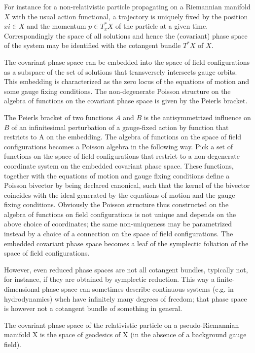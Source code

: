 \documentclass[Main]{subfiles}
\begin{document}
 For instance for a non-relativistic particle propagating on a Riemannian manifold $X$ with the usual action functional, a trajectory is uniquely fixed by the position $xi \in X$ and the momentum $p\in T^*_x X$ of the particle at a given time. 
 Correspondingly the space of all solutions and hence the (covariant) phase space of the system may be identified with the cotangent bundle $T^*X$ of $X$.

 The covariant phase space can be embedded into the space of field configurations as a subspace of the set of solutions that transversely intersects gauge orbits.  
 This embedding is characterized as the zero locus of the equations of motion and some gauge fixing conditions. The non-degenerate Poisson structure on the algebra of functions on the covariant phase space is given by the Peierls bracket.

 The Peierls bracket of two functions $A$ and $B$ is the antisymmetrized influence on $B$ of an infinitesimal perturbation of a gauge-fixed action by function that restricts to A on the embedding. 
 The algebra of functions on the space of field configurations becomes a Poisson algebra in the following way. Pick a set of functions on the space of field configurations that restrict to a non-degenerate coordinate system on the embedded covariant phase space. 
 These functions, together with the equations of motion and gauge fixing conditions define a Poisson bivector by being declared canonical, such that the kernel of the bivector coincides with the ideal generated by the equations of motion and the gauge fixing conditions. 
 Obviously the Poisson structure thus constructed on the algebra of functions on field configurations is not unique and depends on the above choice of coordinates; the same non-uniqueness may be parametrized instead by a choice of a connection on the space of field configurations. 
 The embedded covariant phase space becomes a leaf of the symplectic foliation of the space of field configurations.

 However, even reduced phase spaces are not all cotangent bundles, typically not, for instance, if they are obtained by symplectic reduction. 
 This way a finite-dimensional phase space can sometimes describe continuous systems (e.g. in hydrodynamics) whch have infinitely many degrees of freedom; that phase space is however not a cotangent bundle of something in general.

 \begin{example}
  The covariant phase space of the relativistic particle on a pseudo-Riemannian manifold X is the space of geodesics of X (in the absence of a background gauge field).
 \end{example}
\end{document}
